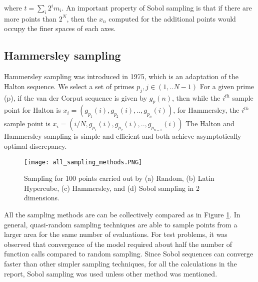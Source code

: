 \bigskip
\noindent
where $t = \sum_{i}2^{i}m_{i}$. An important property of Sobol sampling is that if there are more points than $2^N$, then the $x_n$ computed for the additional points would occupy the finer spaces of each axes. 	

\subsection{Hammersley sampling}
Hammersley sampling was introduced in 1975, which is an adaptation of the Halton sequence. We select a set of primes $p_{j}, j \in (1,.. N-1)$
For a given prime (p), if the van der Corput sequence is given by $g_{p}(n)$, then while the $i^{th}$ sample point for Halton is $x_{i} = (g_{p_{1}}(i), g_{p_{2}}(i), .., g_{p_{n}}(i) )$, for Hammersley, the $i^{th}$ sample point is $x_{i} = (i/N, g_{p_{1}}(i), g_{p_{2}}(i), .., g_{p_{n-1}}(i) )$
The Halton and Hammersley sampling is simple and efficient and both achieve asymptotically optimal discrepancy.


\begin{figure}
\texttt{[image: all\_sampling\_methods.PNG]}
\caption{Sampling for 100 points carried out by (a) Random, (b)  Latin Hypercube, (c) Hammersley, and (d) Sobol sampling in 2 dimensions.}
\label{fig:Sampling}
\end{figure}

\bigskip
\noindent
All the sampling methods are can be collectively compared as in Figure \ref{fig:Sampling}. In general, quasi-random sampling techniques are able to sample points from a larger area for the same number of evaluations. For test problems, it was observed that convergence of the model required about half the number of function calls compared to random sampling. Since Sobol sequences can converge faster than other simpler sampling techniques, for all the calculations in the report, Sobol sampling was used unless other method was mentioned.

